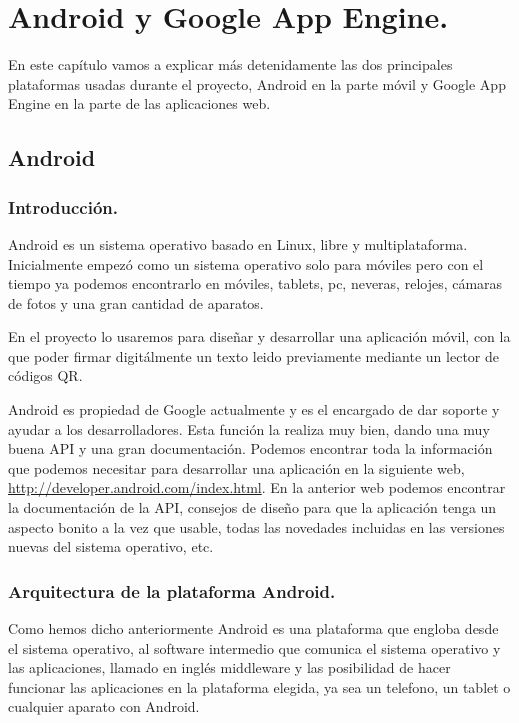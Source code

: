\chapter{Android y Google App Engine.}\label{cap:androidYGAE}

En este capítulo vamos a explicar más detenidamente las dos principales plataformas usadas durante el proyecto, Android en la parte móvil y Google App Engine en la parte de las aplicaciones web. 

\section{Android}\label{cap:android}

\subsection{Introducción.}

Android es un sistema operativo basado en Linux, libre y multiplataforma. Inicialmente empezó como un sistema operativo solo para móviles pero con el tiempo ya podemos encontrarlo en móviles, tablets, pc, neveras, relojes, cámaras de fotos y una gran cantidad de aparatos.

En el proyecto lo usaremos para diseñar y desarrollar una aplicación móvil, con la que poder firmar digitálmente un texto leido previamente mediante un lector de códigos QR.

Android es propiedad de Google actualmente y es el encargado de dar soporte y ayudar a los desarrolladores. Esta función la realiza muy bien, dando una muy buena API y una gran documentación. Podemos encontrar toda la información que podemos necesitar para desarrollar una aplicación en la siguiente web, \url{http://developer.android.com/index.html}. En la anterior web podemos encontrar la documentación de la API, consejos de diseño para que la aplicación tenga un aspecto bonito a la vez que usable, todas las novedades incluidas en las versiones nuevas del sistema operativo, etc.

\subsection{Arquitectura de la plataforma Android.}

Como hemos dicho anteriormente Android es una plataforma que engloba desde el sistema operativo, al software intermedio que comunica el sistema operativo y las aplicaciones, llamado en inglés middleware y las posibilidad de hacer funcionar las aplicaciones en la plataforma elegida, ya sea un telefono, un tablet o cualquier aparato con Android.

